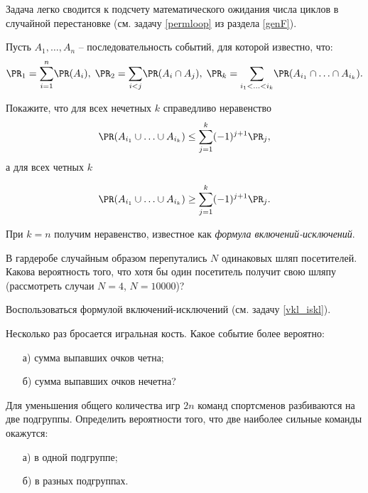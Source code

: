 \begin{ordre}
Задача легко сводится к подсчету математического ожидания числа циклов в случайной перестановке (см. задачу \ref{permloop} из раздела \ref{genF}). 
\end{ordre}


\begin{problem}
\label{vkl_iskl}
Пусть $A_1,\ldots,A_n$ -- последовательность событий, для которой известно, что:
\[
\PR_1 = \underset{i = 1}{\overset{n}{\sum}} \PR(A_i), \;
\PR_2 = \underset{i < j}{\sum} \PR(A_i \cap A_j), \;
\PR_k = \underset{i_1 < \ldots < i_k}{\sum} \PR(A_{i_1} \cap \ldots \cap A_{i_k}).
\]

 Покажите, что для всех нечетных $k$ справедливо неравенство
 \[
 \PR(A_{i_1} \cup \ldots \cup A_{i_k}) \leq \underset{j = 1}{\overset{k}{\sum}} (-1)^{j+1}\PR_j,    
 \]
  а для всех четных $k$
 
 \[
 \PR(A_{i_1} \cup \ldots \cup A_{i_k}) \geq \underset{j = 1}{\overset{k}{\sum}} (-1)^{j+1}\PR_j.	
 \]

 
\end{problem}

\begin{remark}
При $k=n$ получим неравенство, известное как \textit{формула включений-исключений}.
\end{remark}

\begin{problem}
В гардеробе случайным образом перепутались $N$ одинаковых шляп посетителей. Какова вероятность того, что хотя бы один посетитель получит свою шляпу (рассмотреть случаи $N=4$, $N=10000$)?  
\end{problem}

\begin{ordre}
Воспользоваться формулой включений-исключений (см. задачу \ref{vkl_iskl}).
\end{ordre}

\begin{problem}
Несколько раз бросается игральная кость. Какое событие более вероятно: 
\begin{enumerate}
\item[а)] сумма выпавших очков четна; 
\item[б)] сумма выпавших очков нечетна? 
\end{enumerate}
\end{problem}


\begin{problem}
Для уменьшения общего количества игр $2n$ команд спортсменов разбиваются на две подгруппы. Определить вероятности того, что 
две наиболее сильные команды окажутся: 
\begin{enumerate}
\item[а)] в одной подгруппе; 
\item[б)] в разных подгруппах. 
\end{enumerate}
\end{problem}


